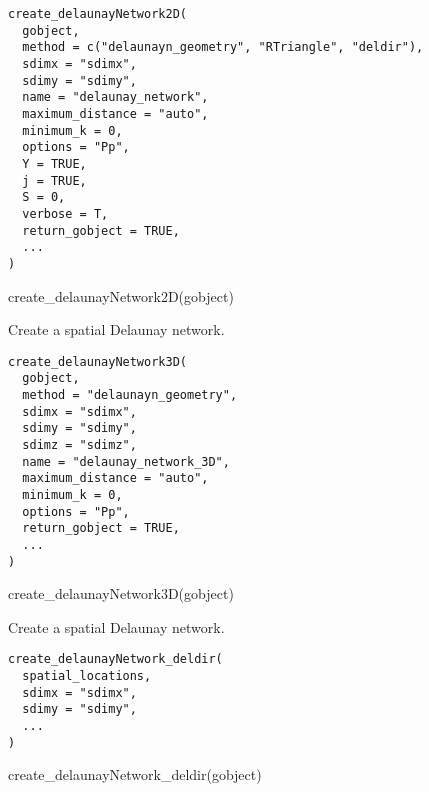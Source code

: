 \documentclass[a4paper]{book}
\begin{document}
%
\begin{Usage}
\begin{verbatim}
create_delaunayNetwork2D(
  gobject,
  method = c("delaunayn_geometry", "RTriangle", "deldir"),
  sdimx = "sdimx",
  sdimy = "sdimy",
  name = "delaunay_network",
  maximum_distance = "auto",
  minimum_k = 0,
  options = "Pp",
  Y = TRUE,
  j = TRUE,
  S = 0,
  verbose = T,
  return_gobject = TRUE,
  ...
)
\end{verbatim}
\end{Usage}
%
\begin{Examples}
\begin{ExampleCode}
    create_delaunayNetwork2D(gobject)
\end{ExampleCode}
\end{Examples}
%
\begin{Description}\relax
Create a spatial Delaunay network.
\end{Description}
%
\begin{Usage}
\begin{verbatim}
create_delaunayNetwork3D(
  gobject,
  method = "delaunayn_geometry",
  sdimx = "sdimx",
  sdimy = "sdimy",
  sdimz = "sdimz",
  name = "delaunay_network_3D",
  maximum_distance = "auto",
  minimum_k = 0,
  options = "Pp",
  return_gobject = TRUE,
  ...
)
\end{verbatim}
\end{Usage}
%
\begin{Examples}
\begin{ExampleCode}
    create_delaunayNetwork3D(gobject)
\end{ExampleCode}
\end{Examples}
%
\begin{Description}\relax
Create a spatial Delaunay network.
\end{Description}
%
\begin{Usage}
\begin{verbatim}
create_delaunayNetwork_deldir(
  spatial_locations,
  sdimx = "sdimx",
  sdimy = "sdimy",
  ...
)
\end{verbatim}
\end{Usage}
%
\begin{Examples}
\begin{ExampleCode}
    create_delaunayNetwork_deldir(gobject)
\end{ExampleCode}
\end{Examples}
\end{document}
